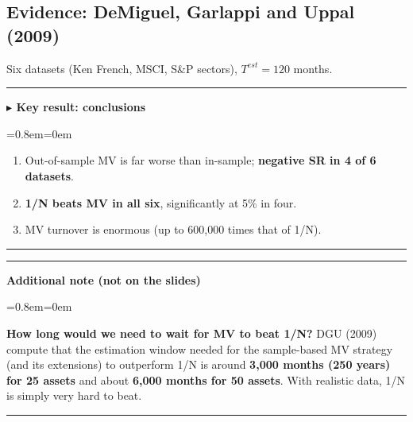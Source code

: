 \documentclass[11pt,a4paper]{report}
\newenvironment{notebox}[1]
  {\par\medskip\Needspace{6\baselineskip}\noindent\rule{\linewidth}{0.4pt}\par\nopagebreak
   \noindent\textbf{#1}\par\nopagebreak
   \begin{list}{}{\leftmargin=0.8em\rightmargin=0em\topsep=2pt}\item[]}
  {\end{list}\nopagebreak\noindent\rule{\linewidth}{0.4pt}\par\medskip}
\newenvironment{keybox}[1][]{\begin{notebox}{$\blacktriangleright$ Key result#1}}{\end{notebox}}
\newenvironment{addnote}{\begin{notebox}{Additional note (not on the slides)}}{\end{notebox}}
\begin{document}
\subsection{Evidence: DeMiguel, Garlappi and Uppal (2009)}
Six datasets (Ken French, MSCI, S\&P sectors), $T^{est}=120$ months.
\begin{center}\small
{}
\end{center}
\begin{keybox}[: conclusions]
\begin{enumerate}
  \item Out-of-sample MV is far worse than in-sample; \textbf{negative SR in 4 of 6 datasets}.
  \item \textbf{1/N beats MV in all six}, significantly at 5\% in four.
  \item MV turnover is enormous (up to 600{,}000 times that of 1/N).
\end{enumerate}
\end{keybox}


\begin{addnote}
\textbf{How long would we need to wait for MV to beat 1/N?} DGU (2009) compute that
the estimation window needed for the sample-based MV strategy (and its extensions)
to outperform 1/N is around \textbf{3{,}000 months (250 years) for 25 assets} and
about \textbf{6{,}000 months for 50 assets}. With realistic data, 1/N is simply
very hard to beat.
\end{addnote}
\end{document}
